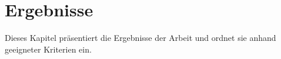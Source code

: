 \chapter{Ergebnisse}

Dieses Kapitel präsentiert die Ergebnisse der Arbeit und ordnet sie anhand geeigneter Kriterien ein.
